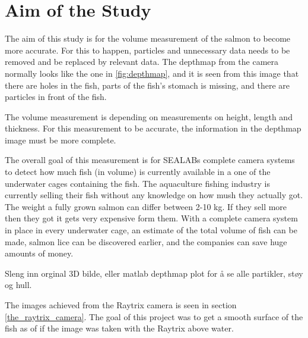\section{Aim of the Study}\label{aim of study}

The aim of this study is for the volume measurement of the salmon to become more accurate. For this to happen, particles and unnecessary data needs to be removed and be replaced by relevant data. The depthmap from the camera normally looks like the one in \ref{fig:depthmap}, and it is seen from this image that there are holes in the fish, parts of the fish's stomach is missing, and there are particles in front of the fish.

The volume measurement is depending on measurements on height, length and thickness. For this measurement to be accurate, the information in the depthmap image must be more complete. 

The overall goal of this measurement is for SEALABs complete camera systems to detect how much fish (in volume) is currently available in a one of the underwater cages containing the fish. 
The aquaculture fishing industry is currently selling their fish without any knowledge on how mush they actually got. The weight a fully grown salmon can differ between 2-10 kg. If they sell more then they got it gets very expensive form them. With a complete camera system in place in every underwater cage, an estimate of the total volume of fish can be made, salmon lice can be discovered earlier, and the companies can save huge amounts of money. 



{\color{red} Sleng inn orginal 3D bilde, eller matlab depthmap plot for å se alle partikler, støy og hull. }

The images achieved from the Raytrix camera is seen in section \ref{the_raytrix_camera}. The goal of this project was to get a smooth surface of the fish as of if the image was taken with the Raytrix above water. 